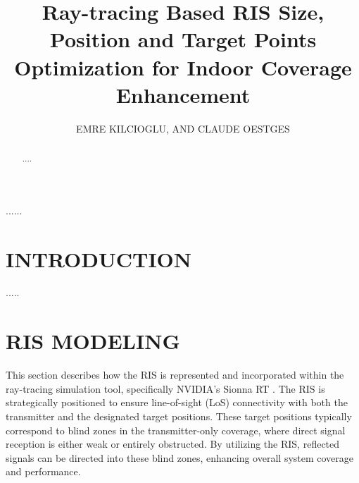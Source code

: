 \documentclass{IEEEoj}
\begin{document}

\title{Ray-tracing Based RIS Size, Position and Target Points Optimization for Indoor Coverage Enhancement}

\author{EMRE KILCIOGLU, AND CLAUDE OESTGES}

\begin{abstract}
....
\end{abstract}

\begin{IEEEkeywords}
......
\end{IEEEkeywords}


\maketitle

\section{INTRODUCTION}
 .....

\section{RIS MODELING}
This section describes how the RIS is represented and incorporated within the ray-tracing simulation tool, specifically NVIDIA's Sionna RT \cite{sionna}. The RIS is strategically positioned to ensure line-of-sight (LoS) connectivity with both the transmitter and the designated target positions. These target positions typically correspond to blind zones in the transmitter-only coverage, where direct signal reception is either weak or entirely obstructed. By utilizing the RIS, reflected signals can be directed into these blind zones, enhancing overall system coverage and performance.
\end{document}
